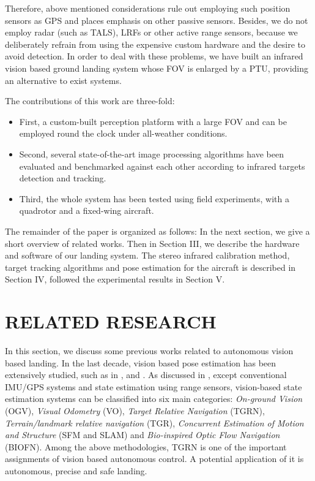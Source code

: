 \documentclass[letterpaper, 10 pt, conference]{ieeeconf}  %
\begin{document}
Therefore, above mentioned considerations rule out employing such position sensors as GPS and places emphasis on other passive sensors. Besides, we do not employ radar (such as TALS), LRFs or other active range sensors, because we deliberately refrain from using the expensive custom hardware and the desire to avoid detection. In order to deal with these problems, we have built an infrared vision based ground landing system whose FOV is enlarged by a PTU, providing an alternative to exist systems.

The contributions of this work are three-fold: 
\begin{itemize}
\item First, a custom-built perception platform with a large FOV and can be employed round the clock under all-weather conditions.
\item Second, several state-of-the-art image processing algorithms have been evaluated and benchmarked against each other according to infrared targets detection and tracking.
\item Third, the whole system has been tested using field experiments, with a quadrotor and a fixed-wing aircraft.
\end{itemize}

The remainder of the paper is organized as follows: In the next section, we give a short overview of related works. Then in Section III, we describe the hardware and software of our landing system. The stereo infrared calibration method, target tracking algorithms and pose estimation for the aircraft is described in Section IV, followed the experimental results in Section V.


\section{RELATED RESEARCH}

In this section, we discuss some previous works related to autonomous vision based landing. In the last decade, vision based pose estimation has been extensively studied, such as in \cite{Shakernia1999}, \cite{Cesetti2010} and \cite{madison2008vision}. As  discussed in \cite{Kendoul2012}, except conventional IMU/GPS systems and state estimation using range sensors, vision-based state estimation systems can be classified into six main categories: {\it On-ground Vision} (OGV), {\it Visual Odometry} (VO), {\it Target Relative Navigation} (TGRN), {\it Terrain/landmark relative navigation} (TGR), {\it Concurrent Estimation of Motion and Structure} (SFM and SLAM) and {\it Bio-inspired Optic Flow Navigation} (BIOFN). Among the above methodologies, TGRN is one of the important assignments of vision based autonomous control. A potential application of it is autonomous, precise and safe landing.
\end{document}
